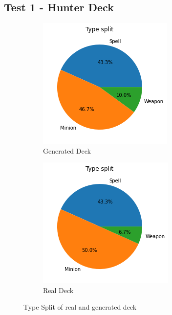 \documentclass{report} %
\begin{document}
\subsection{Test 1 - Hunter Deck}
\begin{figure}[H]
\centering
\begin{subfigure}{.5\textwidth}
  \centering
  \includegraphics[width=.75\linewidth]{TestImages/HunterDeckSplitFake}
  \caption{Generated Deck}
\end{subfigure}%
\begin{subfigure}{.5\textwidth}
  \centering
  \includegraphics[width=.75\linewidth]{TestImages/HunterDeckSplitReal}
  \caption{Real Deck}
\end{subfigure}
\caption{Type Split of real and generated deck}
\end{figure}
\end{document}

